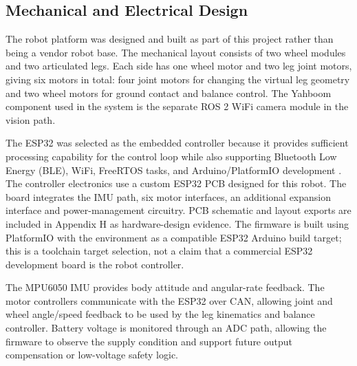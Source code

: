 \documentclass[12pt, a4paper]{article}
\begin{document}
\subsection{Mechanical and Electrical Design}

The robot platform was designed and built as part of this project rather than being a vendor robot base. The mechanical layout consists of two wheel modules and two articulated legs. Each side has one wheel motor and two leg joint motors, giving six motors in total: four joint motors for changing the virtual leg geometry and two wheel motors for ground contact and balance control. The Yahboom component used in the system is the separate ROS 2 WiFi camera module in the vision path.

The ESP32 was selected as the embedded controller because it provides sufficient processing capability for the control loop while also supporting Bluetooth Low Energy (BLE), WiFi, FreeRTOS tasks, and Arduino/PlatformIO development \cite{espressif_freertos_idf,espressif_arduino_esp32,platformio_core_docs}. The controller electronics use a custom ESP32 PCB designed for this robot. The board integrates the IMU path, six motor interfaces, an additional expansion interface and power-management circuitry. PCB schematic and layout exports are included in Appendix H as hardware-design evidence. The firmware is built using PlatformIO with the \texttt{} environment as a compatible ESP32 Arduino build target; this is a toolchain target selection, not a claim that a commercial ESP32 development board is the robot controller.

The MPU6050 IMU provides body attitude and angular-rate feedback. The motor controllers communicate with the ESP32 over CAN, allowing joint and wheel angle/speed feedback to be used by the leg kinematics and balance controller. Battery voltage is monitored through an ADC path, allowing the firmware to observe the supply condition and support future output compensation or low-voltage safety logic.
\end{document}
